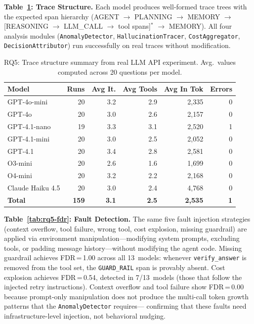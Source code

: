 \documentclass[sigplan,10pt,screen]{acmart}
\begin{document}
\textbf{Table~\ref{tab:rq5-structure}: Trace Structure.}
Each model produces well-formed trace trees with the expected span hierarchy
(AGENT $\to$ PLANNING $\to$ MEMORY $\to$ [REASONING $\to$ LLM\_CALL $\to$
tool spans]$^*$ $\to$ MEMORY).  All four analysis modules
(\texttt{AnomalyDetector}, \texttt{HallucinationTracer},
\texttt{CostAggregator}, \texttt{DecisionAttributor}) run successfully
on real traces without modification.

\begin{table}[t]
\centering
\small
\caption{RQ5: Trace structure summary from real LLM API experiment.
Avg.\ values computed across 20 questions per model.}
\label{tab:rq5-structure}
\begin{tabular}{@{}lrrrrr@{}}
\toprule
\textbf{Model} & \textbf{Runs} & \textbf{Avg It.} & \textbf{Avg Tools} & \textbf{Avg In Tok} & \textbf{Errors} \\
\midrule
GPT-4o-mini     & 20 & 3.2 & 2.9 & 2{,}335 & 0 \\
GPT-4o          & 20 & 3.0 & 2.6 & 2{,}157 & 0 \\
GPT-4.1-nano    & 19 & 3.3 & 3.1 & 2{,}520 & 1 \\
GPT-4.1-mini    & 20 & 3.0 & 2.5 & 2{,}052 & 0 \\
GPT-4.1         & 20 & 3.4 & 2.8 & 2{,}581 & 0 \\
O3-mini         & 20 & 2.6 & 1.6 & 1{,}699 & 0 \\
O4-mini         & 20 & 3.2 & 2.2 & 2{,}168 & 0 \\
Claude Haiku 4.5 & 20 & 3.0 & 2.4 & 4{,}768 & 0 \\
\midrule
\textbf{Total}  & \textbf{159} & \textbf{3.1} & \textbf{2.5} & \textbf{2{,}535} & \textbf{1} \\
\bottomrule
\end{tabular}
\end{table}

\textbf{Table~\ref{tab:rq5-fdr}: Fault Detection.}
The same five fault injection strategies (context overflow, tool failure,
wrong tool, cost explosion, missing guardrail) are applied via environment
manipulation---modifying system prompts, excluding tools, or padding message
history---without modifying the agent code.  Missing guardrail achieves
FDR\,=\,1.00 across all 13~models: whenever \texttt{verify\_answer} is
removed from the tool set, the \texttt{GUARD\_RAIL} span is provably absent.
Cost explosion achieves FDR\,=\,0.54, detected in 7/13~models (those that
follow the injected retry instructions).  Context overflow and tool failure
show FDR\,=\,0.00 because prompt-only manipulation does not produce the
multi-call token growth patterns that the \texttt{AnomalyDetector} requires---
confirming that these faults need infrastructure-level injection, not
behavioral nudging.
\end{document}
